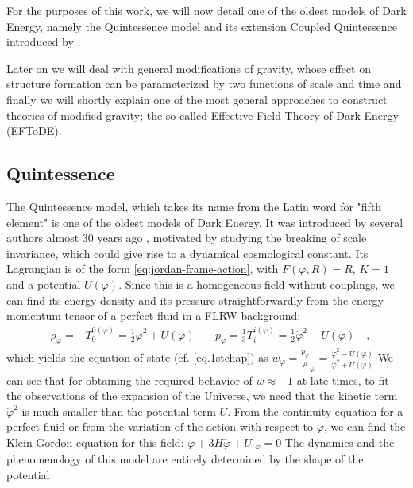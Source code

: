 For the purposes of this work, we will now detail one of the oldest models of Dark Energy, namely
the Quintessence model \cite{Ratra-Peebles; Christof} and its extension
Coupled Quintessence introduced by \cite{Amendola_2000}.

Later on we will deal with general modifications of gravity, whose
effect on structure formation can be parameterized by two functions of
scale and time and finally we will shortly explain one of the most general approaches
to construct theories of modified gravity; the so-called Effective Field Theory of Dark Energy (EFToDE).

\subsection{Quintessence}

The Quintessence model, which takes its name from the Latin word for "fifth element"
is one of the oldest models of Dark Energy. It was introduced by several authors almost 30 years
ago \cite{Wetterich_1988, Ratra, references in Lucas, book}, motivated by studying the 
breaking of scale invariance, which could give rise to a dynamical cosmological constant.
Its Lagrangian is of the form \cref{eq:jordan-frame-action}, with
$F(\varphi, R) = R$, $K = 1$ and a potential $U(\varphi)$.
Since this is a homogeneous field without couplings, we can find its energy density and its pressure 
straightforwardly from the energy-momentum tensor of a perfect fluid in a FLRW background:
\begin{align}
&\rho_{\varphi} = -T^{0 (\varphi)}_0 = \frac{1}{2}\dot\varphi^2 + U(\varphi) \quad 
&p_{\varphi} = \frac{1}{3} T^{i (\varphi)}_i = \frac{1}{2}\dot\varphi^2 - U(\varphi) \quad ,
\end{align}
which yields the equation of state (cf. \cref{eq.1stchap}) as
\beeqp$
w_\varphi  = \frac{p_{\varphi}}\rho_{\varphi} = \frac{\dot\varphi^2 - U(\varphi)}{\dot\varphi^2 + U(\varphi)}
$
We can see that for obtaining the required behavior of $w\approx -1$ at late times, to fit 
the observations of the expansion of the Universe, we need that the kinetic term $\dot\varphi^2$
is much smaller than the potential term $U$.
From the continuity equation for a perfect fluid or from the variation of the action with respect to $\varphi$,
we can find the Klein-Gordon equation for this field:
\beeqp$
\label{eq:Klein-Gordon-Quintessence}
\ddot \varphi + 3 H \dot \varphi + U_{,\varphi} = 0
$
The dynamics and the phenomenology of this model are entirely determined by the shape of the potential

